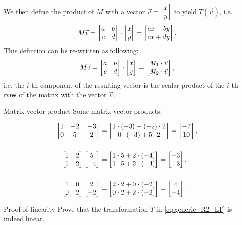 We then define the product of $M$ with a vector $\vec{v}=\colvec{x;y}$ to yield $T \left( \vec{v} \right)$, i.e.
\begin{equation}
	M\vec{v} = \begin{bmatrix} a&b\\c&d \end{bmatrix} \cdot\colvec{x;y} = \colvec{ax+by;cx+dy}.
	\label{eq:matrix_vector_product}
\end{equation}
This defintion can be re-written as following:
\begin{equation}
	M\vec{v} = \begin{bmatrix} a&b\\c&d \end{bmatrix} \cdot\colvec{x;y} = \colvec{M_{1}\cdot\vec{v};M_{2}\cdot\vec{v}},
	\label{eq:matrix_vector_product_as_dot_product}
\end{equation}
i.e. the $i$-th component of the resulting vector is the scalar product of the $i$-th \textbf{row} of the matrix with the vector $\vec{v}$.

\begin{example}{Matrix-vector product}{}
	Some matrix-vector products:

	\begin{align*}
		\begin{bmatrix}
			1 & -2 \\
			0 & 5
		\end{bmatrix}\colvec{-3;2} &= \colvec{1\cdot(-3) + (-2)\cdot2;0\cdot(-3)+5\cdot2} = \colvec{-7;10},\\[5mm]
		\begin{bmatrix}
			1 & 2 \\
			1 & 2
		\end{bmatrix}\colvec{5;-4} &= \colvec{1\cdot5+2\cdot(-4);1\cdot5+2\cdot(-4)} = \colvec{-3;-3},\\[5mm]
		\begin{bmatrix}
			1 & 0 \\
			0 & 2
		\end{bmatrix}\colvec{2;-2} &= \colvec{2\cdot2+0\cdot(-2);0\cdot2+2\cdot(-2)} = \colvec{4;-4}.
	\end{align*}
\end{example}

\begin{challange}{Proof of linearity}{}
	Prove that the transformation $T$ in \autoref{eq:generic_R2_LT} is indeed linear.
\end{challange}

